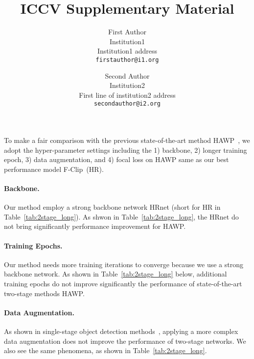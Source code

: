 \documentclass[10pt,twocolumn,letterpaper]{article}
\newcommand{\ours}{F-Clip}
\begin{document}
\title{ICCV Supplementary Material}

\author{First Author\\
Institution1\\
Institution1 address\\
{\tt\small firstauthor@i1.org}
\and
Second Author\\
Institution2\\
First line of institution2 address\\
{\tt\small secondauthor@i2.org}
}

\maketitle
\ificcvfinal\thispagestyle{empty}\fi



\newpage


To make a fair comparison with the previous state-of-the-art method HAWP~\cite{xue2020holistically}, we adopt the hyper-parameter settings including the 1) backbone, 2) longer training epoch, 3) data augmentation, and 4) focal loss on HAWP same as our best performance model \ours~(HR).

\noindent\paragraph{Backbone.}
Our method employ a strong backbone network HRnet \cite{sun2019deep} (short for HR in Table~\ref{tab:2stage_long}). As shwon in Table~\ref{tab:2stage_long}, the HRnet do not bring significantly performance improvement for HAWP.

\noindent\paragraph{Training Epochs.}
Our method needs more training iterations to converge because we use a strong backbone network.  
As shown in Table~\ref{tab:2stage_long} below, additional training epochs do not improve significantly the performance of state-of-the-art two-stage methods HAWP. 

\noindent\paragraph{Data Augmentation.}
As shown in single-stage object detection methods~\cite{liu2016ssd,centernet}, applying a more complex data augmentation does not improve the performance of two-stage networks.  We also see the same phenomena, as shown in Table~\ref{tab:2stage_long}.
\end{document}
